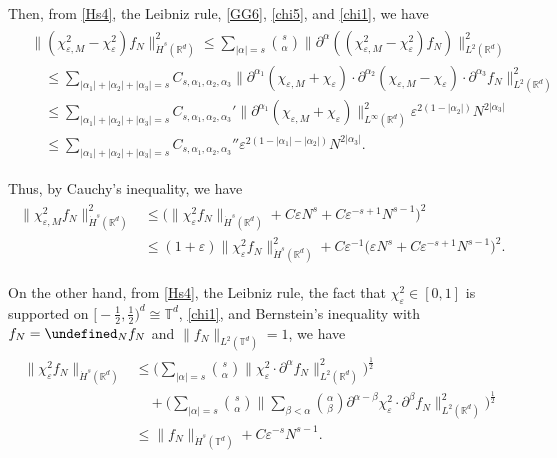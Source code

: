 \documentclass[letterpaper, 11pt,  reqno]{amsart}
\newcommand{\noi}{\noindent}
\newcommand{\R}{\mathbb{R}}
\newcommand{\T}{\mathbb{T}}
\let\P= \undefined
\newcommand{\P}{\mathbf{P}}
\newcommand{\al}{\alpha}
\newcommand{\be}{\beta}
\newcommand{\eps}{\varepsilon}
\newcommand{\dd}{\partial}
\numberwithin{equation}{section}
\numberwithin{theorem}{section}
\begin{document}
\noi
Then, 
from 
\eqref{Hs4},  
the  Leibniz rule, \eqref{GG6},  \eqref{chi5}, and  \eqref{chi1}, we have 
\begin{align}
\begin{split}
& \|  (\chi^2_{\eps,M}-\chi^2_{\eps}) f_N\|_{\dot H^{s}(\R^d)}^2
\le \sum_{|\alpha|=s}\binom{s}{\alpha}
\|\dd^{\alpha}((\chi^2_{\eps,M}-\chi^2_{\eps}) f_N) \|^2_{L^2(\R^d)}\\
&\quad \le \sum_{|\al_1|+ |\al_2|+|\al_3|=s}
C_{s, \al_1, \al_2, \al_3}
\|\dd^{\alpha_1}(\chi_{\eps,M}+\chi_{\eps})
\cdot
\dd^{\alpha_2}(\chi_{\eps,M}- \chi_{\eps}) 
\cdot \dd^{\alpha_3} f_N \|^2_{L^2(\R^d)}\\
&\quad \le \sum_{|\al_1|+ |\al_2|+|\al_3|=s}
C_{s, \al_1, \al_2, \al_3}'
\|\dd^{\alpha_1}(\chi_{\eps,M}+\chi_{\eps})\|_{L^\infty(\R^d)}^2
 \eps^{2(1-|\al_2|)}
N^{2|\al_3|}\\
&\quad \le \sum_{|\al_1|+ |\al_2|+|\al_3|=s}
C_{s, \al_1, \al_2, \al_3}''
 \eps^{2(1-|\al_1| - |\al_2|)}
N^{2|\al_3|}.
\end{split}
\label{GG6a}
\end{align}

\noi
Thus, 
by Cauchy's inequality, we have 
\begin{align}
\begin{split}
 \|  \chi^2_{\eps,M} f_N\|_{\dot H^{s}(\R^d)}^2
& \le   \Big(\|  \chi^2_{\eps} f_N\|_{\dot H^{s}(\R^d)}
+ C \eps N^{s}  + C\eps^{-s + 1} N^{s-1}\Big)^2\\
& \le  (1 + \eps ) \|  \chi^2_{\eps} f_N\|_{\dot H^{s}(\R^d)}^2
+ C \eps^{-1}\Big(\eps N^{s}  + C\eps^{-s + 1} N^{s-1}\Big)^2.
\end{split}
\label{GG5}
\end{align}




On the other hand, 
from \eqref{Hs4}, 
the Leibniz rule, the fact that $ \chi^2_\eps \in [0, 1]$ 
is supported on
$\big[-\tfrac 12 ,\tfrac 12 \big)^d\cong \T^d$, 
 \eqref{chi1},  and Bernstein's inequality
  with 
  $f_N = \P_N f_N$ and 
$\| f_N \|_{L^2(\T^d)} = 1$, 
we have
\begin{align}
\begin{split}
\| \chi^2_{\eps} f_N \|_{\dot H^{s}(\R^d)}
&\le \bigg(\sum_{|\alpha|=s}\binom{s}{\alpha}
\|\chi^2_{\eps} \cdot \dd^{\alpha}f_N \|^2_{L^2(\R^d)}
\bigg)^\frac 12 \\
&\quad
+\bigg(\sum_{|\alpha|=s}\binom{s}{\alpha}
\bigg\|\sum_{\be< \alpha}\binom{\alpha}{\be}\partial^{\alpha-\be}\chi^2_{\eps}
\cdot \partial^{\be}f_N
\bigg\|^2_{L^2(\R^d)} \bigg)^\frac 12 \\
& \le \|f_N\|_{\dot H^{s}(\T^d)}+C \eps^{-s}N^{s-1}.
\end{split}
\label{GG6b}
\end{align}
\end{document}
